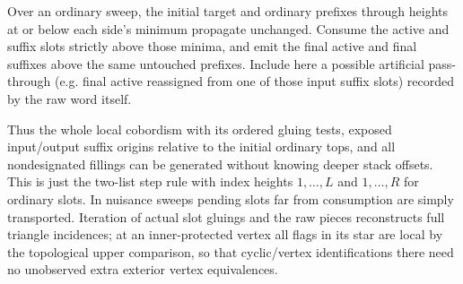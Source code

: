 Over an ordinary sweep, the initial target and
ordinary prefixes through heights at or below each side's minimum propagate unchanged. Consume the active
and suffix slots strictly above those minima, and emit the final active and final suffixes above the same
untouched prefixes. Include here a possible artificial pass-through (e.g. final active reassigned from one
of those input suffix slots) recorded by the raw word itself.

Thus the whole local cobordism with its
ordered gluing tests, exposed input/output suffix origins relative to the initial ordinary tops, and all
nondesignated fillings can be generated without knowing deeper stack offsets. This is just the two-list step
rule with index heights \(1,\dots,L\) and \(1,\dots,R\) for ordinary slots. In nuisance sweeps pending slots
far from consumption are simply transported. Iteration of actual slot gluings and the raw pieces
reconstructs full triangle incidences; at an inner-protected vertex all flags in its star are local by the
topological upper comparison, so that cyclic/vertex identifications there need no unobserved extra exterior
vertex equivalences.

